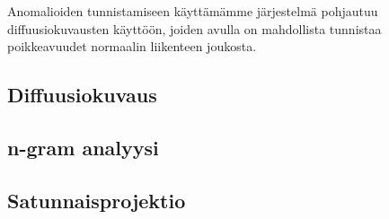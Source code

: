 Anomalioiden tunnistamiseen käyttämämme järjestelmä pohjautuu diffuusiokuvausten käyttöön, joiden avulla on mahdollista tunnistaa poikkeavuudet normaalin liikenteen joukosta. 

\subsection{Diffuusiokuvaus}

\subsection{n-gram analyysi}

\subsection{Satunnaisprojektio}



